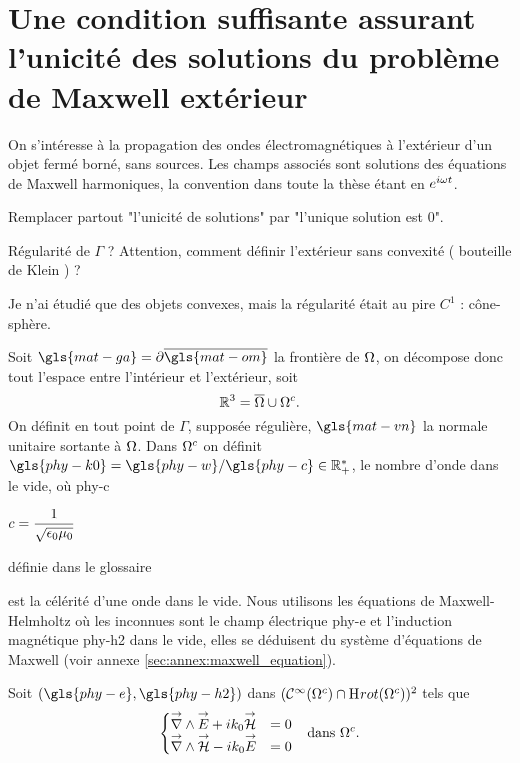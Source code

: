 \section[Une CSU des solutions du problème de Maxwell extérieur]{Une condition suffisante assurant l'unicité des solutions du problème de Maxwell extérieur}

  On s’intéresse à la propagation des ondes électromagnétiques à l'extérieur d'un objet fermé borné, sans sources. Les champs associés sont solutions des équations de Maxwell harmoniques, la convention dans toute la thèse étant en \(e^{i\w t}\). 

  \begin{REM}
    Remplacer partout "l'unicité de solutions" par "l'unique solution est 0".
  \end{REM}

  \begin{REM}
      Régularité de \(\Gamma\) ? Attention, comment définir l'extérieur sans convexité ( bouteille de Klein ) ?
  \end{REM}
  \begin{REP}
      Je n'ai étudié que des objets convexes, mais la régularité était au pire \(C^1\) : cône-sphère.
  \end{REP}
  Soit \(\gls{mat-ga}=\partial\overline{\gls{mat-om}}\) la frontière de \(\OO\), on décompose donc tout l'espace entre l'intérieur et l'extérieur, soit 
  \[
    \RR^3 = \overline{\OO}\cup{\OO}^c.
  \]
  On définit en tout point de \(\Gamma\), supposée régulière, \(\gls{mat-vn}\) la normale unitaire sortante à \(\OO\).
  Dans \(\OO^c\) on définit \(\gls{phy-k0}=\gls{phy-w} / \gls{phy-c} \in \RR_+^*\), le nombre d'onde dans le vide, où \gls{phy-c} 
  \begin{REM} 
      \(c=\frac{1}{\sqrt{\eps_0\mu_0}}\)
  \end{REM}
  \begin{REP}
    définie dans le glossaire 
  \end{REP}
  est la célérité d'une onde dans le vide.
  Nous utilisons les équations de Maxwell-Helmholtz où les inconnues sont le champ électrique \gls{phy-e} et l'induction magnétique \gls{phy-h2} dans le vide, elles se déduisent du système d'équations de Maxwell (voir annexe \ref{sec:annex:maxwell_equation}). 

  Soit \((\gls{phy-e},\gls{phy-h2})\) dans \((\mathcal{C}^\infty(\OO^c)\cap\Sobolev[rot](\OO^c))^2\) tels que
  \begin{align}
  \left\lbrace
    \begin{matrix}
      \vrot \vE + i k_0 \vH &= 0
      \\
      \vrot \vH - i k_0 \vE &= 0
    \end{matrix}
    \right. && \text{dans \(\OO^c\).}
    \label{eq:unicite:maxwell_ext}
  \end{align}

